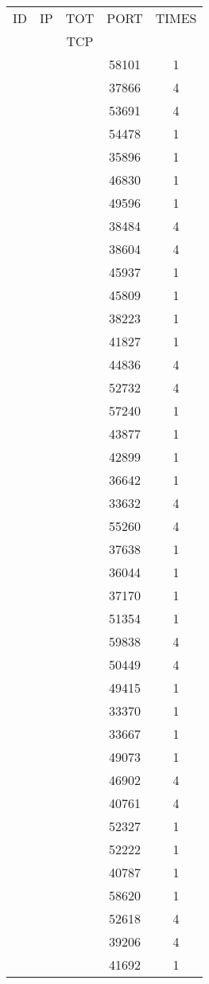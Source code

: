 \documentclass[a4paper]{scrartcl}
\begin{document}
\begin{minipage}[b]{0.5\linewidth}
\begin{tabular}{| c | c | c | c | c |}
\hline
ID & IP & TOT & PORT & TIMES \\ 
   &    & TCP &      &       \\ 
\hline
& & & 58101 & 1 \\ & & & 37866 & 4 \\ & & & 53691 & 4 \\ & & & 54478 & 1 \\ & & & 35896 & 1 \\ & & & 46830 & 1 \\ & & & 49596 & 1 \\ & & & 38484 & 4 \\ & & & 38604 & 4 \\ & & & 45937 & 1 \\ & & & 45809 & 1 \\ & & & 38223 & 1 \\ & & & 41827 & 1 \\ & & & 44836 & 4 \\ & & & 52732 & 4 \\ & & & 57240 & 1 \\ & & & 43877 & 1 \\ & & & 42899 & 1 \\ & & & 36642 & 1 \\ & & & 33632 & 4 \\ & & & 55260 & 4 \\ & & & 37638 & 1 \\ & & & 36044 & 1 \\ & & & 37170 & 1 \\ & & & 51354 & 1 \\ & & & 59838 & 4 \\ & & & 50449 & 4 \\ & & & 49415 & 1 \\ & & & 33370 & 1 \\ & & & 33667 & 1 \\ & & & 49073 & 1 \\ & & & 46902 & 4 \\ & & & 40761 & 4 \\ & & & 52327 & 1 \\ & & & 52222 & 1 \\ & & & 40787 & 1 \\ & & & 58620 & 1 \\ & & & 52618 & 4 \\ & & & 39206 & 4 \\ & & & 41692 & 1 \\ \hline\end{tabular}\end{minipage} \hfill\begin{minipage}[b]{0.5\linewidth}\begin{tabular}{| c | c | c | c | c |}

\end{tabular}
\end{minipage}
\end{document}
